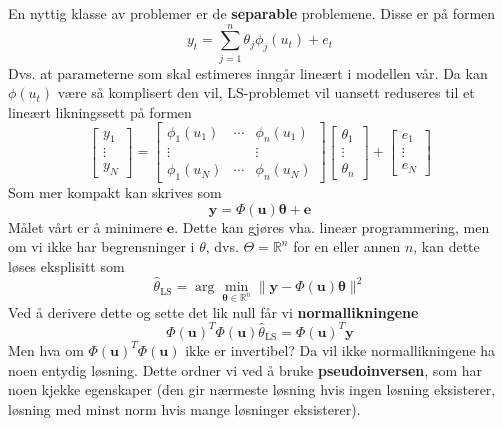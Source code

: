 En nyttig klasse av problemer er de \textbf{separable} problemene. Disse er på formen
\begin{equation}
y_{t}=\sum_{j=1}^{n} \theta_{j} \phi_{j}\left(u_{t}\right)+e_{t}
\end{equation}
Dvs. at parameterne som skal estimeres inngår lineært i modellen vår. Da kan $\phi(u_t)$ være så komplisert den vil, LS-problemet vil uansett reduseres til et lineært likningssett på formen
\begin{equation}
\left[\begin{array}{c}
{y_{1}} \\
{\vdots} \\
{y_{N}}
\end{array}\right]=\left[\begin{array}{ccc}
{\phi_{1}\left(u_{1}\right)} & {\cdots} & {\phi_{n}\left(u_{1}\right)} \\
{\vdots} & {} & {\vdots} \\
{\phi_{1}\left(u_{N}\right)} & {\cdots} & {\phi_{n}\left(u_{N}\right)}
\end{array}\right]\left[\begin{array}{c}
{\theta_{1}} \\
{\vdots} \\
{\theta_{n}}
\end{array}\right]+\left[\begin{array}{c}
{e_{1}} \\
{\vdots} \\
{e_{N}}
\end{array}\right]
\end{equation}
Som mer kompakt kan skrives som
\begin{equation}
\boldsymbol{y}=\Phi(\boldsymbol{u}) \boldsymbol{\theta}+\boldsymbol{e}
\end{equation}
Målet vårt er å minimere $\mathbf{e}$. Dette kan gjøres vha. lineær programmering, men om vi ikke har begrensninger i $\theta$, dvs. $\Theta = \mathbb{R}^n$ for en eller annen $n$, kan dette løses eksplisitt som
\begin{equation}
\widehat{\theta}_{\mathrm{LS}}=\arg \min _{\boldsymbol{\theta} \in \mathbb{R}^{n}}\|\boldsymbol{y}-\Phi(\boldsymbol{u}) \boldsymbol{\theta}\|^{2}
\end{equation}
Ved å derivere dette og sette det lik null får vi \textbf{normallikningene}
\begin{equation}
\Phi(\boldsymbol{u})^{T} \Phi(\boldsymbol{u}) \widehat{\theta}_{\mathrm{LS}}=\Phi(\boldsymbol{u})^{T} \boldsymbol{y}
\end{equation}
Men hva om $
\Phi(\boldsymbol{u})^{T} \Phi(\boldsymbol{u})
$ ikke er invertibel? Da vil ikke normallikningene ha noen entydig løsning. Dette ordner vi ved å bruke \textbf{pseudoinversen}, som har noen kjekke egenskaper (den gir nærmeste løsning hvis ingen løsning eksisterer, løsning med minst norm hvis mange løsninger eksisterer).


